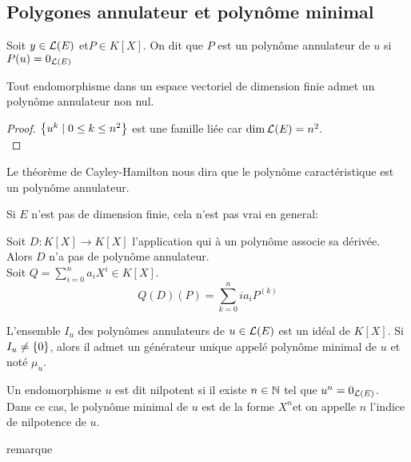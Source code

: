 \subsection{Polygones annulateur et polynôme minimal}


\begin{definition}
	Soit $y \in \mathcal{L}(E)$ et$P \in K[X]$. On dit que $P$ est un polynôme annulateur de $u$ si $P(u) = 0_{\mathcal{L}(E)}$
\end{definition}


\begin{prop}
	Tout endomorphisme dans un espace vectoriel de dimension finie admet un polynôme annulateur non nul.
\end{prop}


\begin{proof}
	$\left\{u^k \mid 0 \leq k \leq n^2\right\}$ est une famille liée car $\dim \mathcal{L}(E) = n^2$.\\
\end{proof}


\begin{remarque}
	Le théorème de Cayley-Hamilton nous dira que le polynôme caractéristique est un polynôme annulateur.
\end{remarque}

\begin{remarque}
	Si $E$ n'est pas de dimension finie, cela n'est pas vrai en general:

	Soit $ D : K[X] \to K[X]$ l'application qui à un polynôme associe sa dérivée. Alors $D$ n'a pas de polynôme annulateur.\\
	Soit $Q = \sum\limits_{i=0}^n a_iX^i \in K[X]$.
	$$Q(D)(P) = \sum\limits_{k=0}^n ia_i P^{(k)}$$
\end{remarque}



\begin{prop}
	L'ensemble $I_u$ des polynômes annulateurs de $u \in \mathcal{L}(E)$ est un idéal de $K[X]$.
	Si $I_u \neq \left\{0\right\}$, alors il admet un générateur unique appelé polynôme minimal de $u$ et noté $\mu_u$.
\end{prop}


\begin{definition}
	Un endomorphisme $u$ est dit nilpotent si il existe $n \in \mathbb{N}$ tel que $u^n = 0_{\mathcal{L}(E)}$.\\
	Dans ce cas, le polynôme minimal de $u$ est de la forme $X^n$et on appelle $n$ l'indice de nilpotence de $u$.
\end{definition}


\begin{remarque}
    remarque
\end{remarque}

